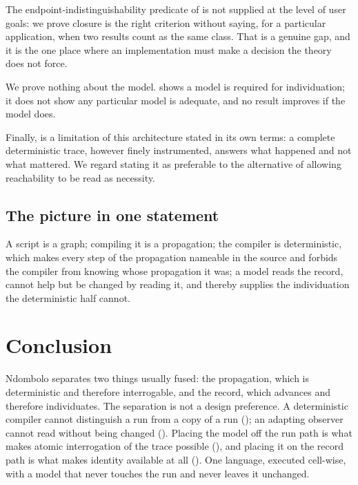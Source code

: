 \documentclass[twocolumn,11pt,a4paper]{article}
\theoremstyle{sup}
\theoremstyle{definition}
\theoremstyle{remark}
\begin{document}
The endpoint-indistinguishability predicate of  is not
supplied at the level of user goals: we prove closure is the right criterion
without saying, for a particular application, when two results count as the
same class. That is a genuine gap, and it is the one place where an
implementation must make a decision the theory does not force.

We prove nothing about the model.  shows a model is
required for individuation; it does not show any particular model is adequate,
and no result improves if the model does.

Finally,  is a limitation of this architecture stated in
its own terms: a complete deterministic trace, however finely instrumented,
answers what happened and not what mattered. We regard stating it as preferable
to the alternative of allowing reachability to be read as necessity.

\subsection{The picture in one statement}

A script is a graph; compiling it is a propagation; the compiler is
deterministic, which makes every step of the propagation nameable in the source
and forbids the compiler from knowing whose propagation it was; a model reads
the record, cannot help but be changed by reading it, and thereby supplies the
individuation the deterministic half cannot.

\section{Conclusion}
\label{sec:concl}

Ndombolo separates two things usually fused: the propagation, which is
deterministic and therefore interrogable, and the record, which advances and
therefore individuates. The separation is not a design preference. A
deterministic compiler cannot distinguish a run from a copy of a run
(); an adapting observer cannot read without being
changed (). Placing the model off the run path is what
makes atomic interrogation of the trace possible
(), and placing it on the record path is
what makes identity available at all (). One
language, executed cell-wise, with a model that never touches the run and never
leaves it unchanged.



\end{document}
